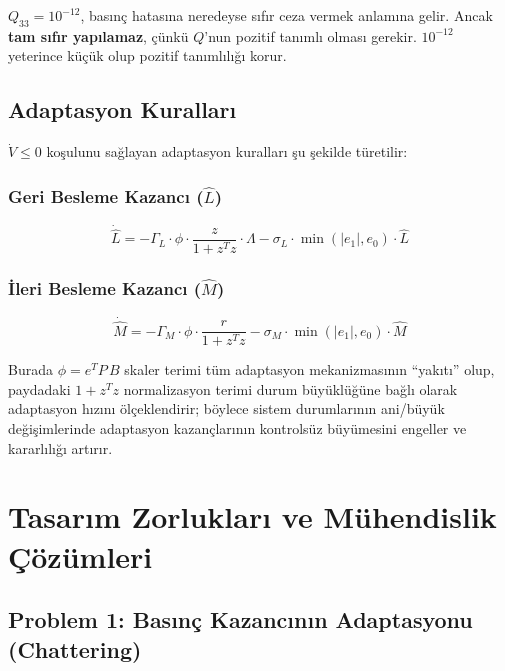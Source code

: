 \documentclass[12pt,a4paper]{article}
\begin{document}
\begin{dikkat}[Neden $10^{-12}$?]
$Q_{33} = 10^{-12}$, basınç hatasına neredeyse sıfır ceza vermek anlamına gelir. Ancak \textbf{tam sıfır yapılamaz}, çünkü $Q$'nun pozitif tanımlı olması gerekir. $10^{-12}$ yeterince küçük olup pozitif tanımlılığı korur.
\end{dikkat}

\subsection{Adaptasyon Kuralları}

$\dot{V} \leq 0$ koşulunu sağlayan adaptasyon kuralları şu şekilde türetilir:

\subsubsection{Geri Besleme Kazancı ($\hat{L}$)}
\begin{equation}
    \boxed{\dot{\hat{L}} = -\Gamma_L \cdot \phi \cdot \frac{z}{1 + z^T z} \cdot \Lambda - \sigma_L \cdot \min(|e_1|, e_0) \cdot \hat{L}}
    \label{eq:L_update}
\end{equation}

\subsubsection{İleri Besleme Kazancı ($\hat{M}$)}
\begin{equation}
    \boxed{\dot{\hat{M}} = -\Gamma_M \cdot \phi \cdot \frac{r}{1 + z^T z} - \sigma_M \cdot \min(|e_1|, e_0) \cdot \hat{M}}
    \label{eq:M_update}
\end{equation}

Burada $\phi = e^T P\,B$ skaler terimi tüm adaptasyon mekanizmasının ``yakıtı'' olup, paydadaki $1 + z^T z$ normalizasyon terimi durum büyüklüğüne bağlı olarak adaptasyon hızını ölçeklendirir; böylece sistem durumlarının ani/büyük değişimlerinde adaptasyon kazançlarının kontrolsüz büyümesini engeller ve kararlılığı artırır.

\section{Tasarım Zorlukları ve Mühendislik Çözümleri}
\label{sec:challenges}

\subsection{Problem 1: Basınç Kazancının Adaptasyonu (Chattering)}
\label{subsec:partial_adaptation}
\end{document}

